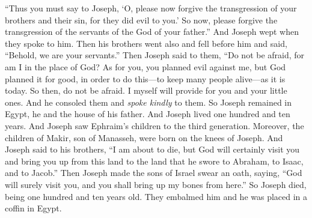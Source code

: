 \begin{biblechapter}
\verse “Thus you must say to Joseph, ‘O, please now forgive the transgression of your brothers and their sin, for they did evil to you.’ So now, please forgive the transgression of the servants of the God of your father.” And Joseph wept when they spoke to him.
\verse Then his brothers went also and fell before him and said, “Behold, we are your servants.”
\verse Then Joseph said to them, “Do not be afraid, for am I in the place of God?
\verse As for you, you planned evil against me, but God planned it for good, in order to do this—to keep many people alive—as it is today.
\verse So then, do not be afraid. I myself will provide for you and your little ones. And he consoled them and \textit{spoke kindly} to them.
 So Joseph remained in Egypt, he and the house of his father. And Joseph lived one hundred and ten years.
\verse And Joseph saw Ephraim’s children to the third generation. Moreover, the children of Makir, son of Manasseh, were born on the knees of Joseph.
\verse And Joseph said to his brothers, “I am about to die, but God will certainly visit you and bring you up from this land to the land that he swore to Abraham, to Isaac, and to Jacob.”
\verse Then Joseph made the sons of Israel swear an oath, saying, “God will surely visit you, and you shall bring up my bones from here.”
\verse So Joseph died, being one hundred and ten years old. They embalmed him and he was placed in a coffin in Egypt.
\end{biblechapter}

